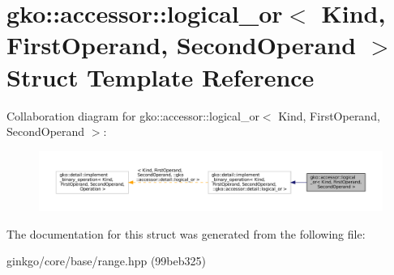 \hypertarget{structgko_1_1accessor_1_1logical__or}{}\section{gko\+:\+:accessor\+:\+:logical\+\_\+or$<$ Kind, First\+Operand, Second\+Operand $>$ Struct Template Reference}
\label{structgko_1_1accessor_1_1logical__or}


Collaboration diagram for gko\+:\+:accessor\+:\+:logical\+\_\+or$<$ Kind, First\+Operand, Second\+Operand $>$\+:
\nopagebreak
\begin{figure}[H]
\begin{center}
\leavevmode
\includegraphics[width=350pt]{structgko_1_1accessor_1_1logical__or__coll__graph}
\end{center}
\end{figure}


The documentation for this struct was generated from the following file\+:\begin{DoxyCompactItemize}
\item 
ginkgo/core/base/range.\+hpp (99beb325)\end{DoxyCompactItemize}
